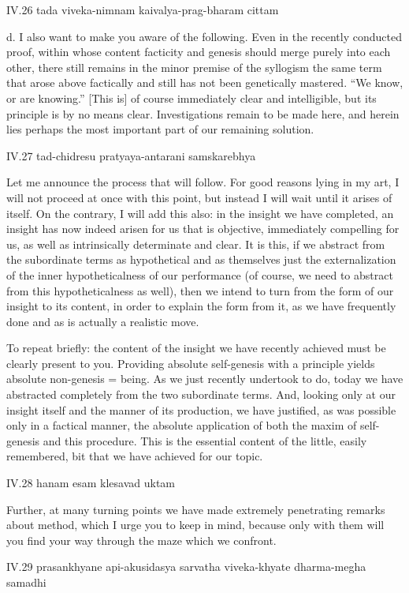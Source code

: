 IV.26
tada viveka-nimnam kaivalya-prag-bharam cittam

d. I also want to make you aware of the following.
Even in the recently conducted proof,
within whose content facticity and genesis should merge
purely into each other,
there still remains in the minor premise of the syllogism
the same term that arose above factically
and still has not been genetically mastered.
“We know, or are knowing.”
[This is] of course immediately clear and intelligible,
but its principle is by no means clear.
Investigations remain to be made here,
and herein lies perhaps the most important
part of our remaining solution.

IV.27
tad-chidresu pratyaya-antarani samskarebhya

Let me announce the process that will follow.
For good reasons lying in my art,
I will not proceed at once with this point,
but instead I will wait until it arises of itself.
On the contrary, I will add this also:
in the insight we have completed,
an insight has now indeed arisen for us
that is objective, immediately compelling for us,
as well as intrinsically determinate and clear.
It is this, if we abstract from the subordinate terms
as hypothetical and as themselves just the externalization of
the inner hypotheticalness of our performance
(of course, we need to abstract from this hypotheticalness as well),
then we intend to turn from the form of our insight
to its content, in order to explain the form from it,
as we have frequently done and as is actually a realistic move.

To repeat briefly:
the content of the insight we have recently achieved
must be clearly present to you.
Providing absolute self-genesis with a principle
yields absolute non-genesis = being.
As we just recently undertook to do,
today we have abstracted completely
from the two subordinate terms.
And, looking only at our insight itself
and the manner of its production, we have justified,
as was possible only in a factical manner,
the absolute application of both
the maxim of self-genesis and this procedure.
This is the essential content of the little, easily remembered,
bit that we have achieved for our topic.

IV.28
hanam esam klesavad uktam

Further, at many turning points we have made
extremely penetrating remarks about method,
which I urge you to keep in mind,
because only with them will you find
your way through the maze which we confront.

IV.29
prasankhyane api-akusidasya sarvatha viveka-khyate dharma-megha samadhi

